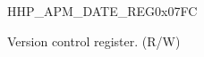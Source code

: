 \begin{register}{H}{HP\_APM\_DATE\_REG}{0x07FC}\label{regdesc:HPAPMDATEREG}
%
%
\regnewline%
\begin{regdesc}\begin{reglist}
\label{fielddesc:HPAPMDATE}\item [HP\_APM\_DATE] Version control register. (R/W)
\end{reglist}\end{regdesc}
\end{register}


